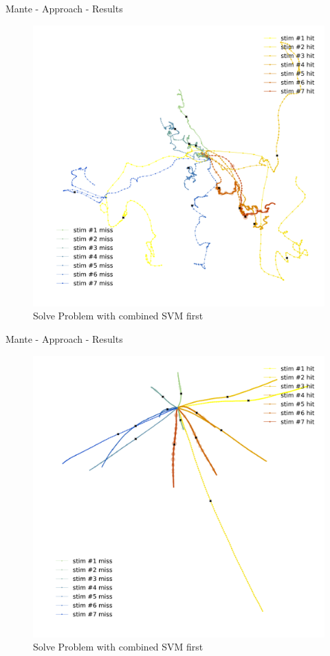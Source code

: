 \documentclass[10pt]{beamer}
\begin{document}
\begin{frame}[fragile]{Mante - Approach - Results}
\begin{center}
	\begin{figure}
	\caption*{Solve Problem with combined SVM first}
      \includegraphics[width=1.0\textwidth]{reg_norm_placeholder.png}
	\end{figure}
	\end{center}
\end{frame}

\begin{frame}[fragile]{Mante - Approach - Results}
\begin{center}
	\begin{figure}
	\caption*{Solve Problem with combined SVM first}
      \includegraphics[width=1.0\textwidth]{reg_inte_placeholder.png}
	\end{figure}
	\end{center}
\end{frame}
\end{document}
